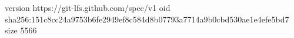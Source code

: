version https://git-lfs.github.com/spec/v1
oid sha256:151c8cc24a9753b6fe2949ef8c584d8b07793a7714a9b0cbd530ae1e4efe5bd7
size 5566
